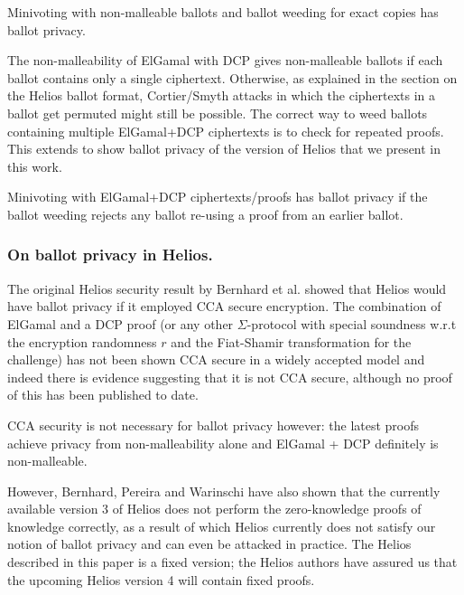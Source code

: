 \documentclass[envcountsame]{llncs}
\newenvironment{helios}{\begin{framed}
\vspace{-18pt}
\begin{figure}
\vspace{-12pt}\quad{\Huge \Sun}
\end{figure}}{\end{framed}}
\begin{document}
\begin{proposition}
Minivoting with non-malleable ballots and ballot weeding for exact copies has
ballot privacy.
\end{proposition}

The non-malleability of ElGamal with DCP gives non-malleable ballots if each
ballot contains only a single ciphertext. Otherwise, as explained in the section
on the Helios ballot format, Cortier/Smyth attacks \cite{CS13} in which the
ciphertexts in a ballot get permuted might still be possible. The correct way
to weed ballots containing multiple ElGamal+DCP ciphertexts is to check for
repeated proofs. This extends to show ballot privacy of the version of Helios
that we present in this work.

\begin{proposition}
Minivoting with ElGamal+DCP ciphertexts/proofs has ballot privacy if the ballot
weeding rejects any ballot re-using a proof from an earlier ballot.
\end{proposition}

\begin{helios}
\subsubsection{On ballot privacy in Helios.}
The original Helios security result by Bernhard et al. \cite{BCPSW11} showed
that Helios would have ballot privacy if it employed CCA secure encryption.
The combination of ElGamal and a DCP proof (or any other $\Sigma$-protocol with
special soundness w.r.t the encryption randomness $r$ and the Fiat-Shamir
transformation for the challenge) has not been shown CCA secure in a widely
accepted model and indeed there is evidence suggesting that it is not CCA
secure, although no proof of this has been published to date.

CCA security is not necessary for ballot privacy however: the latest proofs
\cite{BPW12a,BPW12b} achieve privacy from non-malleability alone and ElGamal +
DCP definitely is non-malleable.

However, Bernhard, Pereira and Warinschi \cite{BPW12b} have also shown that the
currently available version 3 of Helios does not perform the zero-knowledge
proofs of knowledge correctly, as a result of which Helios currently does not
satisfy our notion of ballot privacy and can even be attacked in practice. The
Helios described in this paper is a fixed version; the Helios authors have
assured us that the upcoming Helios version 4 will contain fixed proofs.
\end{helios}
\end{document}
